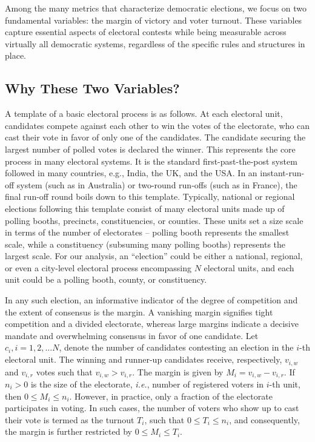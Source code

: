 Among the many metrics that characterize democratic elections, we focus on two fundamental variables: the margin of victory and voter turnout. These variables capture essential aspects of electoral contests while being measurable across virtually all democratic systems, regardless of the specific rules and structures in place.

\subsection{Why These Two Variables?}

A template of a basic electoral process is as follows. At each electoral unit, candidates compete against each other to win the votes of the electorate, who can cast their vote in favor of only one of the candidates. The candidate securing the largest number of polled votes is declared the winner. This represents the core process in many electoral systems. It is the standard first-past-the-post system followed in many countries, e.g., India, the UK, and the USA. In an instant-run-off system (such as in Australia) or two-round run-offs (such as in France), the final run-off round boils down to this template. Typically, national or regional elections following this template consist of many electoral units made up of polling booths, precincts, constituencies, or counties. These units set a size scale in terms of the number of electorates -- polling booth represents the smallest scale, while a constituency (subsuming many polling booths) represents the largest scale. For our analysis, an ``election'' could be either a national, regional, or even a city-level electoral process encompassing $N$ electoral units, and each unit could be a polling booth, county, or constituency.

In any such election, an informative indicator of the degree of competition and the extent of consensus is the margin. A vanishing margin signifies tight competition and a divided electorate, whereas large margins indicate a decisive mandate and overwhelming consensus in favor of one candidate. Let $c_i, i=1, 2, \dots N$, denote the number of candidates contesting an election in the $i$-th electoral unit. The winning and runner-up candidates receive, respectively, $v_{i, w}$ and $v_{i, r}$ votes such that $v_{i, w} > v_{i, r}$. The margin is given by $M_i=v_{i, w}-v_{i, r}$. If $n_i > 0$ is the size of the electorate, {\it i.e.}, number of registered voters in $i$-th unit, then $0 \le M_i \le n_i$. However, in practice, only a fraction of the electorate participates in voting. In such cases, the number of voters who show up to cast their vote is termed as the turnout $T_i$, such that $0 \le T_i \le n_i$, and consequently, the margin is further restricted by $0 \le M_i \le T_i$.

